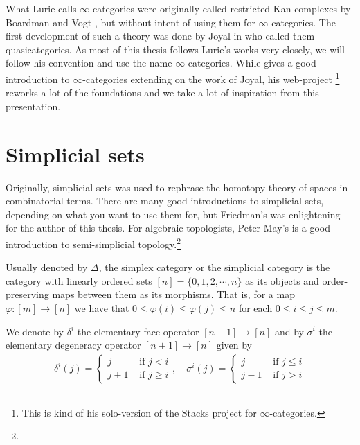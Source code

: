 \documentclass[../../thesis.tex]{subfiles}
\begin{document}
What Lurie \cite{HTT} calls $\infty$-categories were originally called restricted Kan complexes by Boardman and Vogt \cite{BoardmanVogt}, but without intent of using them for $\infty$-categories.
The first development of such a theory was done by Joyal in \cite{Joyal} who called them quasicategories.
As most of this thesis follows Lurie's works very closely, we will follow his convention and use the name $\infty$-categories.
While \cite{HTT} gives a good introduction to $\infty$-categories extending on the work of Joyal, his web-project \cite{kerodon}\footnote{This is kind of his solo-version of the Stacks project for $\infty$-categories.} reworks a lot of the foundations and we take a lot of inspiration from this presentation.
\section{Simplicial sets}
Originally, simplicial sets was used to rephrase the homotopy theory of spaces in combinatorial terms.
There are many good introductions to simplicial sets, depending on what you want to use them for, but Friedman's \cite{friedman2021elementary} was enlightening for the author of this thesis.
For algebraic topologists, Peter May's \cite{MAY} is a good introduction to semi-simplicial topology.\footnote{}
\begin{definition}
    Usually denoted by $\Delta$, the simplex category or the simplicial category is the category with linearly ordered sets $[n]=\{0,1,2,\cdots ,n\}$ as its objects and order-preserving maps between them as its morphisms.
    That is, for a map $\varphi:[m] \to [n]$ we have that $0 \leq \varphi(i)\leq \varphi(j)\leq n$ for each $0 \leq i \leq j \leq m$.
\end{definition}
We denote by $\delta^i$ the elementary face operator $[n-1] \to [n]$ and by $\sigma^i$ the elementary degeneracy operator $[n+1] \to [n]$ given by
\[
    \begin{aligned}
        \delta^i(j) =
        \begin{cases}
            j   & \text{ if } j < i    \\
            j+1 & \text{ if } j \geq i
        \end{cases}, \quad
        \sigma^i(j) =
        \begin{cases}
            j   & \text{ if } j \leq i \\
            j-1 & \text{ if } j > i
        \end{cases}
    \end{aligned}
\]
\end{document}
